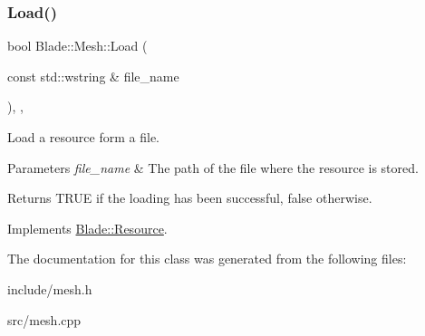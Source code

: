 \subsubsection{\texorpdfstring{Load()}{Load()}}
{\footnotesize\ttfamily bool Blade\+::\+Mesh\+::\+Load (\begin{DoxyParamCaption}\item[{const std\+::wstring \&}]{file\+\_\+name }\end{DoxyParamCaption})\hspace{0.3cm}{\ttfamily [override]}, {\ttfamily [virtual]}, {\ttfamily [noexcept]}}



Load a resource form a file. 


\begin{DoxyParams}{Parameters}
{\em file\+\_\+name} & The path of the file where the resource is stored. \\
\hline
\end{DoxyParams}
\begin{DoxyReturn}{Returns}
T\+R\+UE if the loading has been successful, false otherwise. 
\end{DoxyReturn}


Implements \hyperlink{class_blade_1_1_resource_ad89ab00a3b81df1338a8310ec92c5cff}{Blade\+::\+Resource}.



The documentation for this class was generated from the following files\+:\begin{DoxyCompactItemize}
\item 
include/mesh.\+h\item 
src/mesh.\+cpp\end{DoxyCompactItemize}
